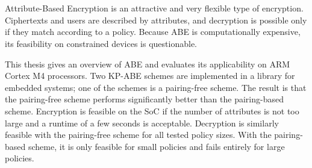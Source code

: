 \chapter{\abstractname}


Attribute-Based Encryption is an attractive and very flexible type of encryption.
Ciphertexts and users are described by attributes, and decryption is possible only if they match according to a policy.
Because ABE is computationally expensive, its feasibility on constrained devices is questionable.

This thesis gives an overview of ABE and evaluates its applicability on ARM Cortex M4 processors.
Two KP-ABE schemes are implemented in a library for embedded systems; one of the schemes is a pairing-free scheme.
The result is that the pairing-free scheme performs significantly better than the pairing-based scheme.
Encryption is feasible on the SoC if the number of attributes is not too large and a runtime of a few seconds is acceptable.
Decryption is similarly feasible with the pairing-free scheme for all tested policy sizes.
With the pairing-based scheme, it is only feasible for small policies and fails entirely for large policies.



